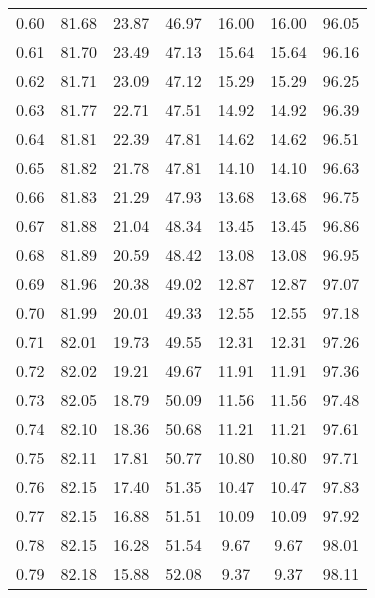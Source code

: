 \begin{tabular}{|c|c|c|c|c|c|c|}
      0.60 &     81.68 &     23.87 &      46.97 &   16.00 &      16.00 &         96.05 \\
      0.61 &     81.70 &     23.49 &      47.13 &   15.64 &      15.64 &         96.16 \\
      0.62 &     81.71 &     23.09 &      47.12 &   15.29 &      15.29 &         96.25 \\
      0.63 &     81.77 &     22.71 &      47.51 &   14.92 &      14.92 &         96.39 \\
      0.64 &     81.81 &     22.39 &      47.81 &   14.62 &      14.62 &         96.51 \\
      0.65 &     81.82 &     21.78 &      47.81 &   14.10 &      14.10 &         96.63 \\
      0.66 &     81.83 &     21.29 &      47.93 &   13.68 &      13.68 &         96.75 \\
      0.67 &     81.88 &     21.04 &      48.34 &   13.45 &      13.45 &         96.86 \\
      0.68 &     81.89 &     20.59 &      48.42 &   13.08 &      13.08 &         96.95 \\
      0.69 &     81.96 &     20.38 &      49.02 &   12.87 &      12.87 &         97.07 \\
      0.70 &     81.99 &     20.01 &      49.33 &   12.55 &      12.55 &         97.18 \\
      0.71 &     82.01 &     19.73 &      49.55 &   12.31 &      12.31 &         97.26 \\
      0.72 &     82.02 &     19.21 &      49.67 &   11.91 &      11.91 &         97.36 \\
      0.73 &     82.05 &     18.79 &      50.09 &   11.56 &      11.56 &         97.48 \\
      0.74 &     82.10 &     18.36 &      50.68 &   11.21 &      11.21 &         97.61 \\
      0.75 &     82.11 &     17.81 &      50.77 &   10.80 &      10.80 &         97.71 \\
      0.76 &     82.15 &     17.40 &      51.35 &   10.47 &      10.47 &         97.83 \\
      0.77 &     82.15 &     16.88 &      51.51 &   10.09 &      10.09 &         97.92 \\
      0.78 &     82.15 &     16.28 &      51.54 &    9.67 &       9.67 &         98.01 \\
      0.79 &     82.18 &     15.88 &      52.08 &    9.37 &       9.37 &         98.11 \\

\end{tabular}
